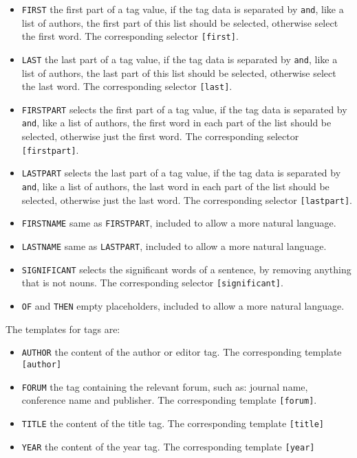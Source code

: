\begin{itemize}
\item \texttt{FIRST} the first part of a tag value, if the tag data is
  separated by \texttt{and}, like a list of authors, the first part of
  this list should be selected, otherwise select the first word.  The
  corresponding selector \texttt{[first]}.
\item \texttt{LAST} the last part of a tag value, if the tag data is
  separated by \texttt{and}, like a list of authors, the last part of
  this list should be selected, otherwise select the last word.  The
  corresponding selector \texttt{[last]}.
\item \texttt{FIRSTPART} selects the first part of a tag value, if the
  tag data is separated by \texttt{and}, like a list of authors, the
  first word in each part of the list should be selected, otherwise
  just the first word.  The corresponding selector
  \texttt{[firstpart]}.
\item \texttt{LASTPART} selects the last part of a tag value, if the
  tag data is separated by \texttt{and}, like a list of authors, the
  last word in each part of the list should be selected, otherwise
  just the last word.  The corresponding selector \texttt{[lastpart]}.
\item \texttt{FIRSTNAME} same as \texttt{FIRSTPART}, included to allow
  a more natural language.
\item \texttt{LASTNAME} same as \texttt{LASTPART}, included to allow
  a more natural language.
\item \texttt{SIGNIFICANT} selects the significant words of a
  sentence, by removing anything that is not nouns.  The
  corresponding selector \texttt{[significant]}.  
\item \texttt{OF} and \texttt{THEN} empty placeholders, included to
  allow a more natural language.
\end{itemize}

The templates for tags are:

\begin{itemize}
\item \texttt{AUTHOR} the content of the author or editor tag.  The
  corresponding template \texttt{[author]}
\item \texttt{FORUM} the tag containing the relevant forum, such as:
  journal name, conference name and publisher.  The corresponding
  template \texttt{[forum]}.
\item \texttt{TITLE} the content of the title tag.  The corresponding
  template \texttt{[title]}
\item \texttt{YEAR} the content of the year tag.  The corresponding
  template \texttt{[year]}
\end{itemize}

